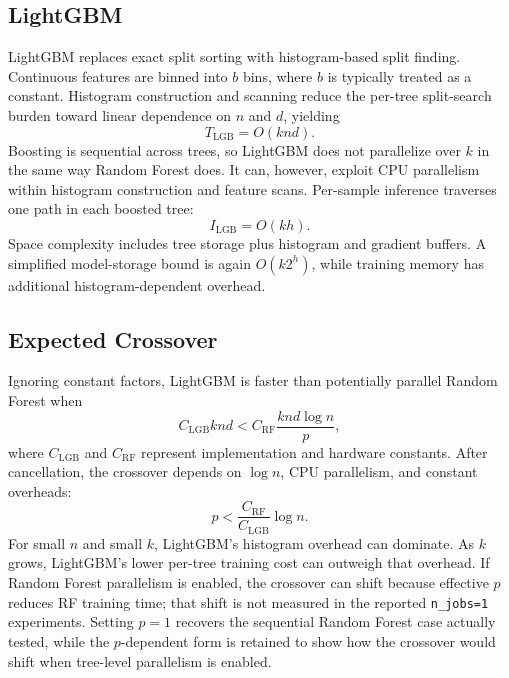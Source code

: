 \documentclass[11pt]{article}
\begin{document}
\subsection{LightGBM}
LightGBM replaces exact split sorting with histogram-based split finding. Continuous features are binned into $b$ bins, where $b$ is typically treated as a constant. Histogram construction and scanning reduce the per-tree split-search burden toward linear dependence on $n$ and $d$, yielding
\begin{equation}
T_{\mathrm{LGB}} = O(knd).
\end{equation}
Boosting is sequential across trees, so LightGBM does not parallelize over $k$ in the same way Random Forest does. It can, however, exploit CPU parallelism within histogram construction and feature scans. Per-sample inference traverses one path in each boosted tree:
\begin{equation}
I_{\mathrm{LGB}} = O(kh).
\end{equation}
Space complexity includes tree storage plus histogram and gradient buffers. A simplified model-storage bound is again $O(k2^h)$, while training memory has additional histogram-dependent overhead.

\subsection{Expected Crossover}
Ignoring constant factors, LightGBM is faster than potentially parallel Random Forest when
\begin{equation}
C_{\mathrm{LGB}} knd < C_{\mathrm{RF}} \frac{knd\log n}{p},
\end{equation}
where $C_{\mathrm{LGB}}$ and $C_{\mathrm{RF}}$ represent implementation and hardware constants. After cancellation, the crossover depends on $\log n$, CPU parallelism, and constant overheads:
\begin{equation}
p < \frac{C_{\mathrm{RF}}}{C_{\mathrm{LGB}}}\log n.
\end{equation}
For small $n$ and small $k$, LightGBM's histogram overhead can dominate. As $k$ grows, LightGBM's lower per-tree training cost can outweigh that overhead. If Random Forest parallelism is enabled, the crossover can shift because effective $p$ reduces RF training time; that shift is not measured in the reported \texttt{n\_jobs=1} experiments. Setting $p=1$ recovers the sequential Random Forest case actually tested, while the $p$-dependent form is retained to show how the crossover would shift when tree-level parallelism is enabled.
\end{document}
